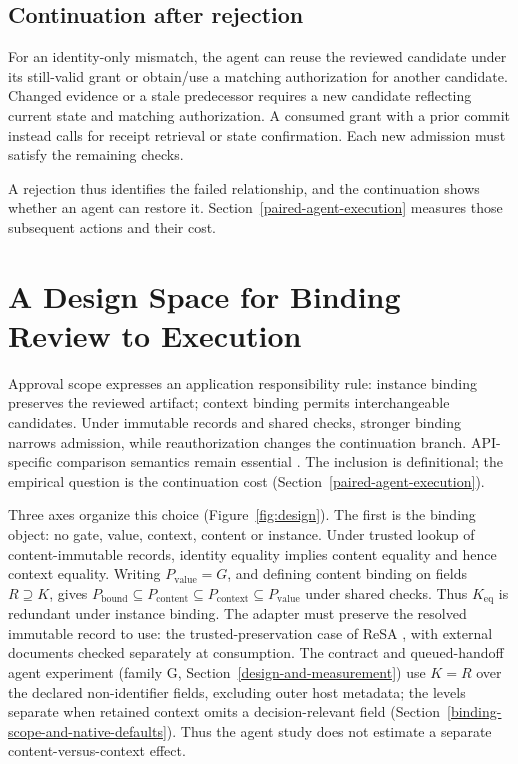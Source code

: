\documentclass[pdflatex,sn-basic]{sn-jnl}
\begin{document}
\subsection{Continuation after rejection}\label{continuation-after-rejection}

For an identity-only mismatch, the agent can reuse the reviewed candidate under its still-valid grant or obtain/use a matching authorization for another candidate. Changed evidence or a stale predecessor requires a new candidate reflecting current state and matching authorization. A consumed grant with a prior commit instead calls for receipt retrieval or state confirmation. Each new admission must satisfy the remaining checks.

A rejection thus identifies the failed relationship, and the continuation shows whether an agent can restore it. Section~\ref{paired-agent-execution} measures those subsequent actions and their cost.

\section{A Design Space for Binding Review to Execution}\label{design-space}

Approval scope expresses an application responsibility rule: instance binding preserves the reviewed artifact; context binding permits interchangeable candidates. Under immutable records and shared checks, stronger binding narrows admission, while reauthorization changes the continuation branch. API-specific comparison semantics remain essential \citep{rfc9396}. The inclusion is definitional; the empirical question is the continuation cost (Section~\ref{paired-agent-execution}).

Three axes organize this choice (Figure~\ref{fig:design}). The first is the binding object: no gate, value, context, content or instance. Under trusted lookup of content-immutable records, identity equality implies content equality and hence context equality. Writing \(P_{\mathrm{value}}=G\), and defining content binding on fields \(R\supseteq K\), gives \(P_{\mathrm{bound}} \subseteq P_{\mathrm{content}} \subseteq P_{\mathrm{context}} \subseteq P_{\mathrm{value}}\) under shared checks. Thus \(K_{\mathrm{eq}}\) is redundant under instance binding. The adapter must preserve the resolved immutable record to use: the trusted-preservation case of ReSA \citep{zhu2026resa}, with external documents checked separately at consumption. The contract and queued-handoff agent experiment (family G, Section~\ref{design-and-measurement}) use \(K=R\) over the declared non-identifier fields, excluding outer host metadata; the levels separate when retained context omits a decision-relevant field (Section~\ref{binding-scope-and-native-defaults}). Thus the agent study does not estimate a separate content-versus-context effect.
\end{document}
